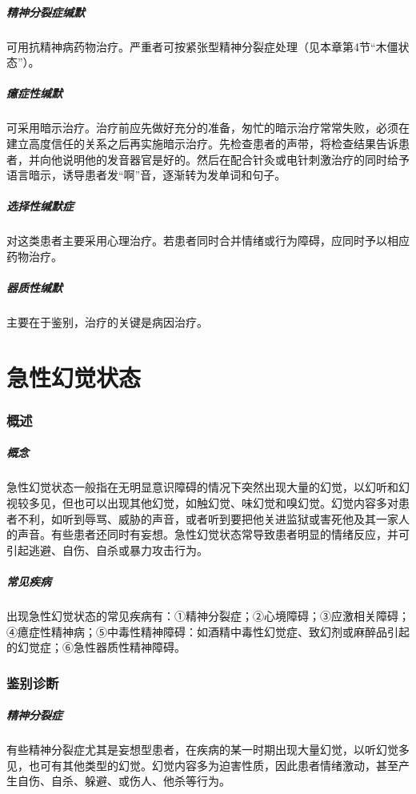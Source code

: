 \subparagraph{精神分裂症缄默}

可用抗精神病药物治疗。严重者可按紧张型精神分裂症处理（见本章第4节“木僵状态”）。

\subparagraph{癔症性缄默}

可采用暗示治疗。治疗前应先做好充分的准备，匆忙的暗示治疗常常失败，必须在建立高度信任的关系之后再实施暗示治疗。先检查患者的声带，将检查结果告诉患者，并向他说明他的发音器官是好的。然后在配合针灸或电针刺激治疗的同时给予语言暗示，诱导患者发“啊”音，逐渐转为发单词和句子。

\subparagraph{选择性缄默症}

对这类患者主要采用心理治疗。若患者同时合并情绪或行为障碍，应同时予以相应药物治疗。

\subparagraph{器质性缄默}

主要在于鉴别，治疗的关键是病因治疗。

\protect\hypertarget{text00048.html}{}{}

\section{急性幻觉状态}

\subsubsection{概述}

\subparagraph{概念}

急性幻觉状态一般指在无明显意识障碍的情况下突然出现大量的幻觉，以幻听和幻视较多见，但也可以出现其他幻觉，如触幻觉、味幻觉和嗅幻觉。幻觉内容多对患者不利，如听到辱骂、威胁的声音，或者听到要把他关进监狱或害死他及其一家人的声音。有些患者还同时有妄想。急性幻觉状态常导致患者明显的情绪反应，并可引起逃避、自伤、自杀或暴力攻击行为。

\subparagraph{常见疾病}

出现急性幻觉状态的常见疾病有：①精神分裂症；②心境障碍；③应激相关障碍；④癔症性精神病；⑤中毒性精神障碍：如酒精中毒性幻觉症、致幻剂或麻醉品引起的幻觉症；⑥急性器质性精神障碍。

\subsubsection{鉴别诊断}

\subparagraph{精神分裂症}

有些精神分裂症尤其是妄想型患者，在疾病的某一时期出现大量幻觉，以听幻觉多见，也可有其他类型的幻觉。幻觉内容多为迫害性质，因此患者情绪激动，甚至产生自伤、自杀、躲避、或伤人、他杀等行为。

